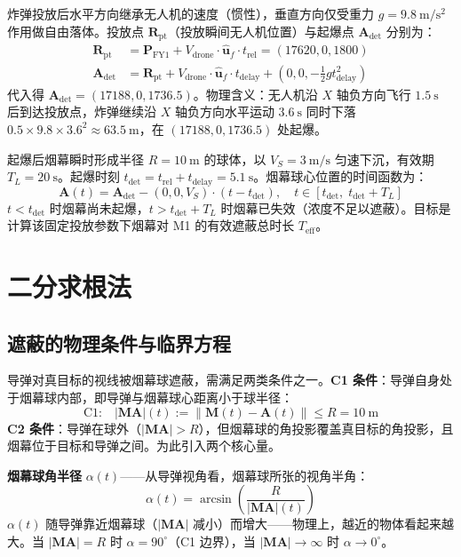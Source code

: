 \documentclass[12pt,a4paper]{ctexart}
\newcommand{\tdet}{t_{\text{det}}}
\newcommand{\Teff}{T_{\text{eff}}}
\newcommand{\MA}{|\mathbf{M}\mathbf{A}|}
\begin{document}
炸弹投放后水平方向继承无人机的速度（惯性），垂直方向仅受重力 $g = 9.8\ \mathrm{m/s^2}$ 作用做自由落体。投放点 $\mathbf{R}_{\text{pt}}$（投放瞬间无人机位置）与起爆点 $\mathbf{A}_{\text{det}}$ 分别为：
\begin{align}
\mathbf{R}_{\text{pt}} &= \mathbf{P}_{\text{FY1}} + V_{\text{drone}} \cdot \hat{\mathbf{u}}_f \cdot t_{\text{rel}} = (17620, 0, 1800) \\
\mathbf{A}_{\text{det}} &= \mathbf{R}_{\text{pt}} + V_{\text{drone}} \cdot \hat{\mathbf{u}}_f \cdot t_{\text{delay}} + (0, 0, -\tfrac{1}{2} g t_{\text{delay}}^2)
\end{align}
代入得 $\mathbf{A}_{\text{det}} = (17188, 0, 1736.5)$。物理含义：无人机沿 $X$ 轴负方向飞行 $1.5\ \mathrm{s}$ 后到达投放点，炸弹继续沿 $X$ 轴负方向水平运动 $3.6\ \mathrm{s}$ 同时下落 $0.5 \times 9.8 \times 3.6^2 \approx 63.5\ \mathrm{m}$，在 $(17188, 0, 1736.5)$ 处起爆。

起爆后烟幕瞬时形成半径 $R = 10\ \mathrm{m}$ 的球体，以 $V_S = 3\ \mathrm{m/s}$ 匀速下沉，有效期 $T_L = 20\ \mathrm{s}$。起爆时刻 $\tdet = t_{\text{rel}} + t_{\text{delay}} = 5.1\ \mathrm{s}$。烟幕球心位置的时间函数为：
\begin{equation}
\boxed{\mathbf{A}(t) = \mathbf{A}_{\text{det}} - (0, 0, V_S) \cdot (t - \tdet), \quad t \in [\tdet,\; \tdet + T_L]}
\end{equation}
$t < \tdet$ 时烟幕尚未起爆，$t > \tdet + T_L$ 时烟幕已失效（浓度不足以遮蔽）。目标是计算该固定投放参数下烟幕对 M1 的有效遮蔽总时长 $\Teff$。

\section{二分求根法}

\subsection{遮蔽的物理条件与临界方程}

导弹对真目标的视线被烟幕球遮蔽，需满足两类条件之一。\textbf{C1 条件}：导弹自身处于烟幕球内部，即导弹与烟幕球心距离小于球半径：
\begin{equation}
\text{C1:}\quad \MA(t) := \|\mathbf{M}(t) - \mathbf{A}(t)\| \leq R = 10\ \mathrm{m}
\end{equation}
\textbf{C2 条件}：导弹在球外（$\MA > R$），但烟幕球的角投影覆盖真目标的角投影，且烟幕位于目标和导弹之间。为此引入两个核心量。

\textbf{烟幕球角半径} $\alpha(t)$——从导弹视角看，烟幕球所张的视角半角：
\begin{equation}
\boxed{\alpha(t) = \arcsin\!\left(\frac{R}{\MA(t)}\right)}
\end{equation}
$\alpha(t)$ 随导弹靠近烟幕球（$\MA$ 减小）而增大——物理上，越近的物体看起来越大。当 $\MA = R$ 时 $\alpha = 90^\circ$（C1 边界），当 $\MA \to \infty$ 时 $\alpha \to 0^\circ$。
\end{document}
